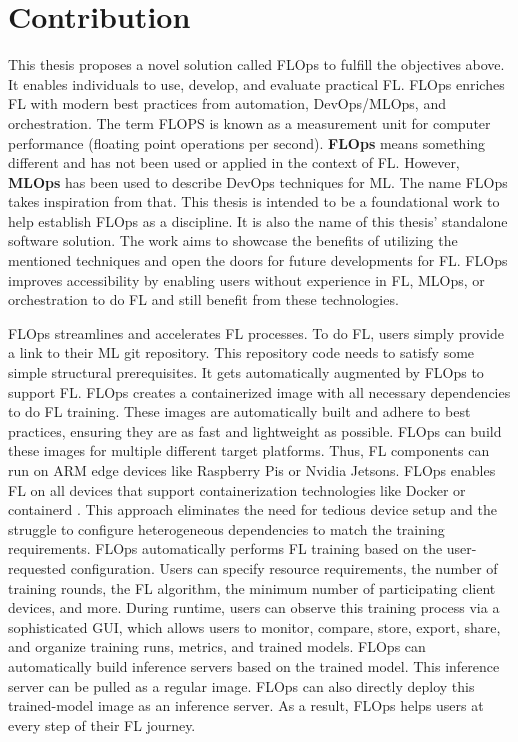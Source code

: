 \section{Contribution}\label{section:contributions}

This thesis proposes a novel solution called FLOps to fulfill the objectives above.
It enables individuals to use, develop, and evaluate practical FL.
FLOps enriches FL with modern best practices from automation, DevOps/MLOps, and orchestration.
The term FLOPS is known as a measurement unit for computer performance (floating point operations per second).
\textbf{FLOps} means something different and has not been used or applied in the context of FL.
However, \textbf{MLOps} has been used to describe DevOps techniques for ML.
The name FLOps takes inspiration from that.
This thesis is intended to be a foundational work to help establish FLOps as a discipline.
It is also the name of this thesis' standalone software solution.
The work aims to showcase the benefits of utilizing the mentioned techniques and open the doors for future developments for FL.
FLOps improves accessibility by enabling users without experience in FL, MLOps, or orchestration to do FL and still benefit from these technologies.

FLOps streamlines and accelerates FL processes.
To do FL, users simply provide a link to their ML git repository.
This repository code needs to satisfy some simple structural prerequisites.
It gets automatically augmented by FLOps to support FL.
FLOps creates a containerized image with all necessary dependencies to do FL training.
These images are automatically built and adhere to best practices, ensuring they are as fast and lightweight as possible.
FLOps can build these images for multiple different target platforms.
Thus, FL components can run on ARM edge devices like Raspberry Pis or Nvidia Jetsons.
FLOps enables FL on all devices that support containerization technologies like Docker or containerd \cite{containerd_docs}.
This approach eliminates the need for tedious device setup and the struggle to configure heterogeneous dependencies to match the training requirements.
FLOps automatically performs FL training based on the user-requested configuration.
Users can specify resource requirements, the number of training rounds, the FL algorithm, the minimum number of participating client devices, and more.
During runtime, users can observe this training process via a sophisticated GUI, which allows users to monitor, compare, store, export, share, and organize training runs, metrics, and trained models.
FLOps can automatically build inference servers based on the trained model.
This inference server can be pulled as a regular image.
FLOps can also directly deploy this trained-model image as an inference server.
As a result, FLOps helps users at every step of their FL journey.

